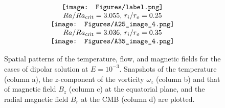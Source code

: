 \begin{figure*}
\begin{center}
\[
\begin{array}{c}
 \texttt{[image: Figures/label.png]} \\
 \mbox{$Ra / Ra_{\rm crit} = 3.055$, $r_{i} / r_{o} = 0.25$} \\
 \texttt{[image: Figures/A25\_image\_4.png]} \\
 \mbox{$Ra / Ra_{\rm crit} = 3.036$, $r_{i} / r_{o} = 0.35$} \\
 \texttt{[image: Figures/A35\_image\_4.png]}
\end{array}
\]
\end{center}
\caption{Spatial patterns of the temperature, flow,  and magnetic fields for the cases of dipolar solution at $E = 10^{-3}$. 
Snapshots of the temperature (column a), the $z$-component of the vorticity $\omega_{z}$ (column b) and that of magnetic field $B_{z}$ (column c) at the equatorial plane, and the radial magnetic field $B_{r}$ at the CMB (column d) are plotted.
}
\label{fig:Snap_Dipoler_E1-3}
\end{figure*}